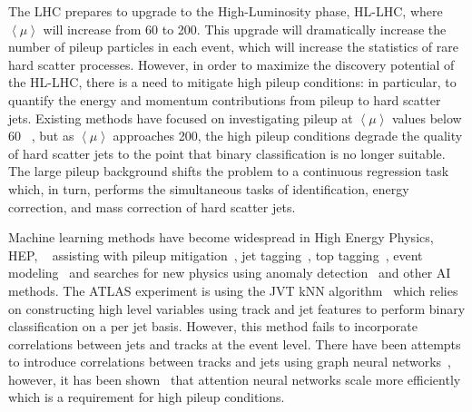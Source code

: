 
The LHC prepares to upgrade to the High-Luminosity phase, HL-LHC, where $\left\langle \mu \right\rangle$ will increase from 60 to 200. This upgrade will dramatically increase the number of pileup particles in each event, which will increase the statistics of rare hard scatter processes. However, in order to maximize the discovery potential of the HL-LHC, there is a need to mitigate high pileup conditions: in particular, to quantify the energy and momentum contributions from pileup to hard scatter jets. Existing methods have focused on investigating pileup at $\left<\mu\right>$ values below 60 ~\cite{ATLAS-CONF-2014-018}, but as $\left<\mu\right>$ approaches 200, the high pileup conditions degrade the quality of hard scatter jets to the point that binary classification is no longer suitable. The large pileup background shifts the problem to a continuous regression task which, in  turn, performs the simultaneous tasks of identification, energy correction, and mass correction of hard scatter jets.

Machine learning methods have become widespread in High Energy Physics, HEP, ~\cite{he2023high,Larkoski_2020} assisting with pileup mitigation~\cite{komiske2017pileup}, jet tagging~\cite{ParticleNet}, top tagging~\cite{Barman_2024}, event modeling~\cite{kansal2021particle} and searches for new physics using anomaly detection~\cite{duarte2024novelmachinelearningapplications} and other AI methods. The ATLAS experiment is using the JVT kNN algorithm~\cite{ATLAS-CONF-2014-018} which relies on constructing high level variables using track and jet features to perform binary classification on a per jet basis.  However, this method fails to incorporate correlations between jets and tracks at the event level. There have been attempts to introduce correlations between tracks and jets using graph neural networks~\cite{ParticleNet,ABCNet}, however, it has been shown~\cite{qu2022particle} that attention neural networks scale more efficiently which is a requirement for high pileup conditions.

